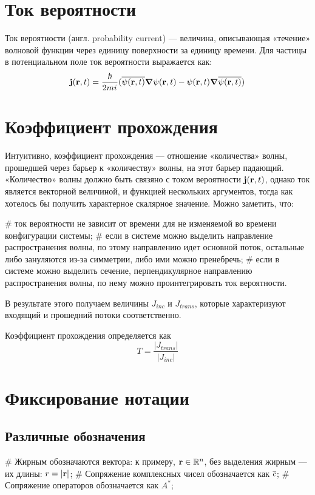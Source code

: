 \section{Ток вероятности}
Ток вероятности (англ. probability current) — величина, описывающая «течение» волновой функции через единицу поверхности за единицу времени. Для частицы в потенциальном поле ток вероятности выражается как:
\[
\vb{j}(\vb{r}, t) = \frac{\hbar}{2 m {i\mkern1mu}} (\overline{\psi(\vb{r}, t)} \grad{\psi(\vb{r}, t)} - \psi(\vb{r}, t) \grad{\overline{\psi(\vb{r}, t)})}
\]

\section{Коэффициент прохождения}
Интуитивно, коэффициент прохождения — отношение «количества» волны, прошедшей через барьер к «количеству» волны, на этот барьер падающий. «Количество» волны должно быть связяно с током вероятности $\vb{j}(\vb{r}, t)$, однако ток является векторной величиной, и функцией нескольких аргументов, тогда как хотелось бы получить характерное скалярное значение. Можно заметить, что:

\begin{easylist}[itemize]
# ток вероятности не зависит от времени для не изменяемой во времени конфигурации системы;
# если в системе можно выделить направление распространения волны, по этому направлению идет основной поток, остальные либо зануляются из-за симметрии, либо ими можно пренебречь;
# если в системе можно выделить сечение, перпендикулярное направлению распространения волны, по нему можно проинтегрировать ток вероятности.
\end{easylist}

В результате этого получаем величины $J_{inc}$ и $J_{trans}$, которые характеризуют входящий и прошедний потоки соответственно. 

Коэффициент прохождения определяется как
\[
T = \frac{|J_{trans}|}{|J_{inc}|}
\]

\section{Фиксирование нотации}
\subsection{Различные обозначения}

\begin{ilist}
# Жирным обозначаются вектора: к примеру, $\vb{r} \in \mathbb{R}^n$, без выделения жирным — их длины: $r = |\vb{r}|$;
# Сопряжение комплексных чисел обозначается как $\overline{c}$;
# Сопряжение операторов обозначается как $A^*$;
\end{ilist}

